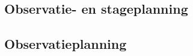 
\begin{landscape}
	
	\vspace*{-0.4cm}
\section{Observatie- en stageplanning}
\vspace*{-0.3cm}\subsection{Observatieplanning}

\end{landscape}
